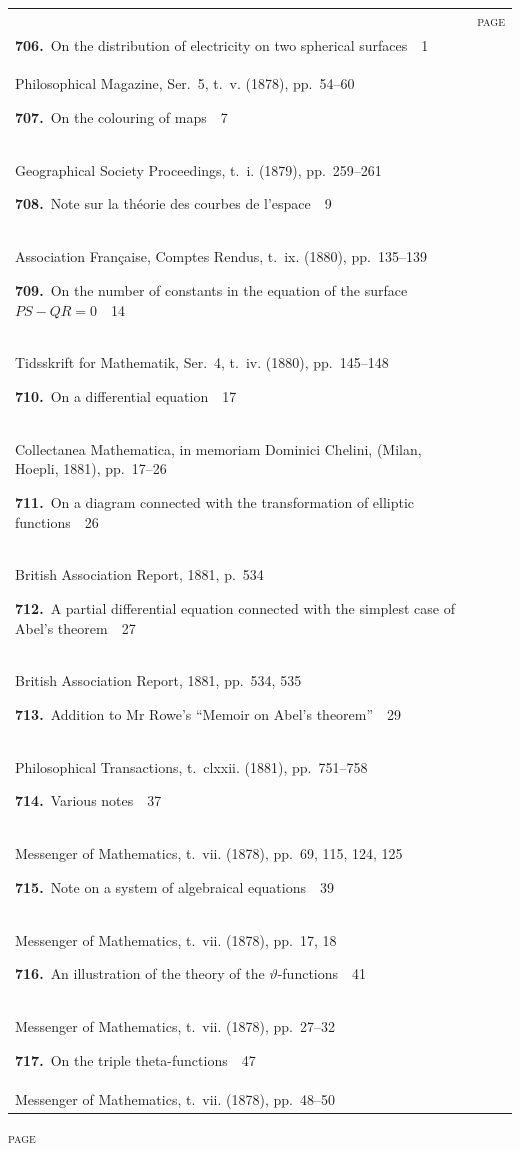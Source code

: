 \documentclass[11pt,a4paper]{book}
\newcommand{\paperentry}[4]{%
  \noindent\textbf{#1.}\ {#2}\ \dotfill\ {#3}\\[-0.2em]%
  {\small #4}\par\vspace{0.6em}%
}
\begin{document}
\begin{center}
\begin{tabular}{p{4.2in}r}
& \textsc{page} \\
\paperentry{706}{On the distribution of electricity on two spherical surfaces}{1}{Philosophical Magazine, Ser.~5, t.~v. (1878), pp.~54--60}
\paperentry{707}{On the colouring of maps}{7}{Geographical Society Proceedings, t.~i. (1879), pp.~259--261}
\paperentry{708}{Note sur la th\'{e}orie des courbes de l'espace}{9}{Association Fran\c{c}aise, Comptes Rendus, t.~ix. (1880), pp.~135--139}
\paperentry{709}{On the number of constants in the equation of the surface $PS - QR = 0$}{14}{Tidsskrift for Mathematik, Ser.~4, t.~iv. (1880), pp.~145--148}
\paperentry{710}{On a differential equation}{17}{Collectanea Mathematica, in memoriam Dominici Chelini, (Milan, Hoepli, 1881), pp.~17--26}
\paperentry{711}{On a diagram connected with the transformation of elliptic functions}{26}{British Association Report, 1881, p.~534}
\paperentry{712}{A partial differential equation connected with the simplest case of Abel's theorem}{27}{British Association Report, 1881, pp.~534, 535}
\paperentry{713}{Addition to Mr Rowe's ``Memoir on Abel's theorem''}{29}{Philosophical Transactions, t.~clxxii. (1881), pp.~751--758}
\paperentry{714}{Various notes}{37}{Messenger of Mathematics, t.~vii. (1878), pp.~69, 115, 124, 125}
\paperentry{715}{Note on a system of algebraical equations}{39}{Messenger of Mathematics, t.~vii. (1878), pp.~17, 18}
\paperentry{716}{An illustration of the theory of the $\vartheta$-functions}{41}{Messenger of Mathematics, t.~vii. (1878), pp.~27--32}
\paperentry{717}{On the triple theta-functions}{47}{Messenger of Mathematics, t.~vii. (1878), pp.~48--50}
\end{tabular}
\end{center}

\newpage
\thispagestyle{fancy}
\begin{center}
{\small\textsc{page}}
\end{center}
\vspace{-0.5em}
\end{document}
